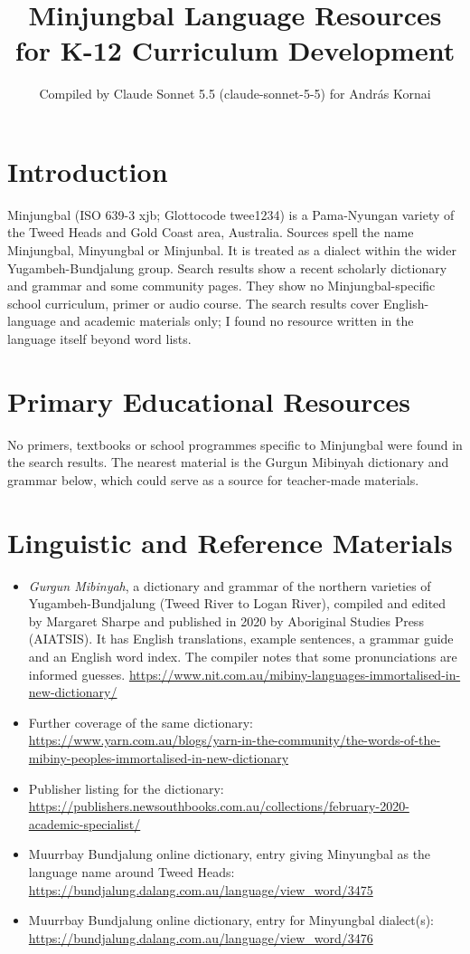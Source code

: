 \documentclass[12pt]{article}
\title{Minjungbal Language Resources for K-12 Curriculum Development}
\author{Compiled by Claude Sonnet 5.5 (claude-sonnet-5-5) for Andr\'as Kornai}
\date{}
\begin{document}
\maketitle

\section{Introduction}
Minjungbal (ISO 639-3 xjb; Glottocode twee1234) is a Pama-Nyungan variety of the Tweed Heads and Gold Coast area, Australia. Sources spell the name Minjungbal, Minyungbal or Minjunbal. It is treated as a dialect within the wider Yugambeh-Bundjalung group. Search results show a recent scholarly dictionary and grammar and some community pages. They show no Minjungbal-specific school curriculum, primer or audio course. The search results cover English-language and academic materials only; I found no resource written in the language itself beyond word lists.

\section{Primary Educational Resources}
No primers, textbooks or school programmes specific to Minjungbal were found in the search results. The nearest material is the Gurgun Mibinyah dictionary and grammar below, which could serve as a source for teacher-made materials.

\section{Linguistic and Reference Materials}
\begin{itemize}
\item \emph{Gurgun Mibinyah}, a dictionary and grammar of the northern varieties of Yugambeh-Bundjalung (Tweed River to Logan River), compiled and edited by Margaret Sharpe and published in 2020 by Aboriginal Studies Press (AIATSIS). It has English translations, example sentences, a grammar guide and an English word index. The compiler notes that some pronunciations are informed guesses. \url{https://www.nit.com.au/mibiny-languages-immortalised-in-new-dictionary/}
\item Further coverage of the same dictionary: \url{https://www.yarn.com.au/blogs/yarn-in-the-community/the-words-of-the-mibiny-peoples-immortalised-in-new-dictionary}
\item Publisher listing for the dictionary: \url{https://publishers.newsouthbooks.com.au/collections/february-2020-academic-specialist/}
\item Muurrbay Bundjalung online dictionary, entry giving Minyungbal as the language name around Tweed Heads: \url{https://bundjalung.dalang.com.au/language/view_word/3475}
\item Muurrbay Bundjalung online dictionary, entry for Minyungbal dialect(s): \url{https://bundjalung.dalang.com.au/language/view_word/3476}
\end{itemize}
\end{document}
